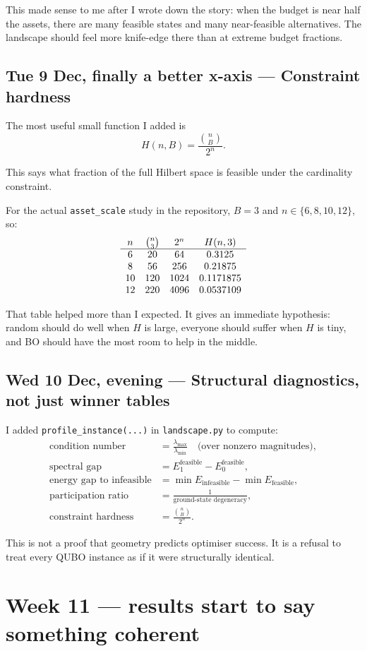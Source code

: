\documentclass[11pt]{article}
\newcommand{\entry}[2]{\subsection*{#1 --- #2}}
\newcommand{\repo}[1]{\texttt{#1}}
\begin{document}
This made sense to me after I wrote down the story:
when the budget is near half the assets, there are many feasible states and many near-feasible
alternatives. The landscape should feel more knife-edge there than at extreme budget fractions.

\entry{Tue 9 Dec, finally a better x-axis}{Constraint hardness}

The most useful small function I added is
\[
H(n,B) = \frac{\binom{n}{B}}{2^n}.
\]

This says what fraction of the full Hilbert space is feasible under the cardinality constraint.

For the actual \repo{asset\_scale} study in the repository, \(B=3\) and
\(n \in \{6,8,10,12\}\), so:
\[
\begin{array}{c c c c}
n & \binom{n}{3} & 2^n & H(n,3) \\
\hline
6  & 20  & 64   & 0.3125 \\
8  & 56  & 256  & 0.21875 \\
10 & 120 & 1024 & 0.1171875 \\
12 & 220 & 4096 & 0.0537109
\end{array}
\]

That table helped more than I expected.
It gives an immediate hypothesis:
random should do well when \(H\) is large, everyone should suffer when \(H\) is tiny, and BO
should have the most room to help in the middle.

\entry{Wed 10 Dec, evening}{Structural diagnostics, not just winner tables}

I added \repo{profile\_instance(...)} in \repo{landscape.py} to compute:
\begin{align*}
\text{condition number} &= \frac{\lambda_{\max}}{\lambda_{\min}} \quad \text{(over nonzero magnitudes)},\\
\text{spectral gap} &= E^{\text{feasible}}_1 - E^{\text{feasible}}_0,\\
\text{energy gap to infeasible} &= \min E_{\text{infeasible}} - \min E_{\text{feasible}},\\
\text{participation ratio} &= \frac{1}{\text{ground-state degeneracy}},\\
\text{constraint hardness} &= \frac{\binom{n}{B}}{2^n}.
\end{align*}

This is not a proof that geometry predicts optimiser success.
It is a refusal to treat every QUBO instance as if it were structurally identical.

\section*{Week 11 --- results start to say something coherent}
\end{document}
